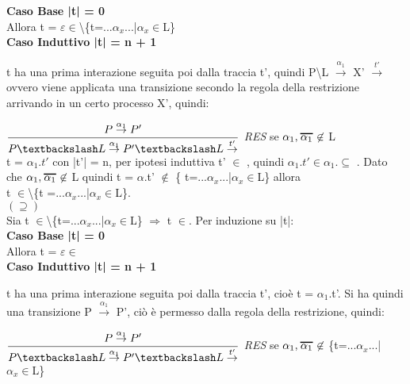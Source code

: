 \textbf{Caso Base |t| = 0}
\\
Allora t = $\varepsilon \in$\textbackslash\{t=...$\alpha_{x}$...|$\alpha_{x}\in$L\}
\\

\textbf{Caso Induttivo |t| = n + 1}

t ha una prima interazione seguita poi dalla traccia t', quindi P\textbackslash L $ \overset{\alpha_{1}}\rightarrow $ X' $\overset{t'}\rightarrow$ ovvero viene applicata una transizione secondo la regola della restrizione arrivando in un certo processo X', quindi:
	
	$\dfrac{P \overset{\alpha_{1}}\rightarrow P'}{P\textbackslash L \overset{\alpha_{1}}\rightarrow P'\textbackslash L\overset{t'}\rightarrow}$ \textit{RES} se $\alpha_{1}, \Overline[1pt]{\alpha_{1}} \not\in$ L\\
	
	t = $\alpha_{1}.t'$ con |t'| = n, per ipotesi induttiva t' $\in$ , quindi 
	$\alpha_{1}.t' \in \alpha_{1}$.$\subseteq$ . Dato che $\alpha_{1}, \Overline[1pt]{\alpha_{1}} \not\in$ L quindi t = $\alpha$.t' $\not \in$ \{ t=...$\alpha_{x}$...|$\alpha_{x}\in$L\}  allora \\
	t $\in$\textbackslash \{t =...$\alpha_{x}$...|$\alpha_{x}\in$L\}.\\

$(\supseteq)$\\

Sia  t $\in$\textbackslash\{t=...$\alpha_{x}$...|$\alpha_{x}\in$L\} $\Rightarrow$ t $\in$.   
Per induzione su |t|:
\\

\textbf{Caso Base |t| = 0}
\\
Allora t = $\varepsilon \in$
\\

\textbf{Caso Induttivo |t| = n + 1}

t ha una prima interazione seguita poi dalla traccia t', cioè t = $\alpha_{1}$.t'. Si ha quindi una transizione P $\overset{\alpha_{1}}\rightarrow$ P', ciò è permesso dalla regola della restrizione, quindi:

$\dfrac{P \overset{\alpha_{1}}\rightarrow P'}{P\textbackslash L \overset{\alpha_{1}}\rightarrow P'\textbackslash L\overset{t'}\rightarrow}$ \textit{RES} se $\alpha_{1}, \Overline[1pt]{\alpha_{1}} \not\in$ \{t=...$\alpha_{x}$...|$\alpha_{x}\in$L\}\\

